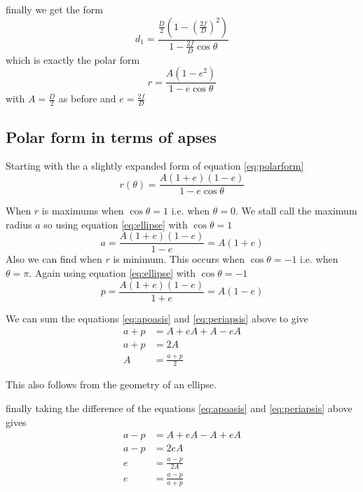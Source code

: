\documentclass[a5paper,12pt]{article}
\begin{document}
finally we get the form
\begin{equation}
d_1=\frac{\frac{D}{2}\left(1-\left(\frac{2f}{D}\right)^2\right)}{1-  \frac{2f}{D}\cos \theta}\label{eq:rawPolarForm}
\end{equation}
which is exactly the polar form
\begin{equation}
r=\frac{A\left(1-e^2\right)}{1- e\cos \theta}\label{eq:polarform}
\end{equation}
with $A=\frac{D}{2}$ as before and $e=\frac{2f}{D}$

\subsection{Polar form in terms of apses}
Starting with the a slightly expanded form of equation \ref{eq:polarform}
\begin{equation} \label{eq:ellipse}
r(\theta)=\frac{A(1+e)(1-e)}{1-e \cos \theta} 
\end{equation}

When $r$ is maximums when $\cos \theta=1$ i.e. when $\theta=0$.
We stall call the maximum radius $a$ so using equation \ref{eq:ellipse} with $\cos \theta=1$
\begin{equation} \label{eq:apoasis}
a=\frac{A(1+e)(1-e)}{1-e}=A(1+e)
\end{equation}
Also we can find when $r$ is minimum. This occurs when $\cos \theta=-1$ i.e. when $\theta=\pi$. Again using equation \ref{eq:ellipse} with $\cos \theta=-1$
\begin{equation} \label{eq:periapsis}
p=\frac{A(1+e)(1-e)}{1+e}=A(1-e)
\end{equation}

We can sum the equations \ref{eq:apoasis} and \ref{eq:periapsis} above to give 
\begin{align}
a+p&=A+eA+A-eA \nonumber \\
a+p&=2A \nonumber \\
A&=\frac{a+p}{2}\label{eq:ApoPeri:semiMajorAxis}
\end{align}

This also follows from the geometry of an ellipse.

finally taking the difference of the equations \ref{eq:apoasis} and \ref{eq:periapsis} above gives
\begin{align}
a-p&=A+eA-A+eA \nonumber \\
a-p&=2eA \nonumber \\
e&=\frac{a-p}{2A} \nonumber \\
e&=\frac{a-p}{a+p} \label{eq:ApoPeri:ecentricity}
\end{align}
\end{document}
